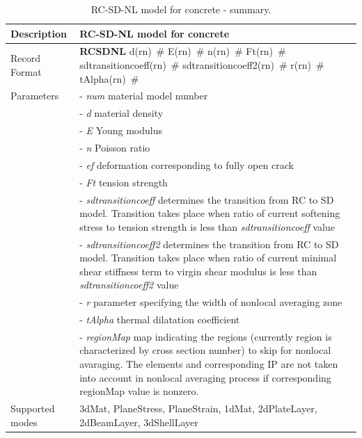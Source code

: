 \documentclass[epsf,a4paper]{article}
\newcommand{\descitem}[1]{{\noindent \bf #1}}
\newcommand{\elemparam}[2]{{{#1\tiny (#2)}~\#}}
\newcommand{\param}[1]{{\it #1}}
\begin{document}
\begin{table}[h]                                                                
\begin{tabular}{|l|p{9cm}|}                                                      
\hline                                                                          
Description & RC-SD-NL model for concrete\\
\hline                                                                          
Record Format & \descitem{RCSDNL} \elemparam{d}{rn} \elemparam{E}{rn}
\elemparam{n}{rn}  \elemparam{Ft}{rn}
\elemparam{sdtransitioncoeff}{rn} \elemparam{sdtransitioncoeff2}{rn}
\elemparam{r}{rn} \elemparam{tAlpha}{rn} \\
Parameters &- \param{num} material model number\\
&- \param{d} material density\\
&- \param{E} Young modulus\\
&- \param{n} Poisson ratio\\
&- \param{ef} deformation corresponding to fully open crack\\
&- \param{Ft} tension strength\\
&- \param{sdtransitioncoeff} determines the transition from RC to SD
model. Transition takes place when ratio of current softening
stress to tension strength is less than  \param{sdtransitioncoeff} value\\
&- \param{sdtransitioncoeff2} determines the transition from RC to SD
model. Transition takes place when ratio of current minimal shear
stiffness term to virgin shear modulus is less than  \param{sdtransitioncoeff2} value\\
&- \param{r} parameter specifying the width of nonlocal averaging zone\\
&- \param{tAlpha} thermal dilatation coefficient\\
&- \param{regionMap} map indicating the regions (currently region is
characterized by cross section number) to skip for nonlocal
avaraging. The elements and corresponding IP are not taken into
account in nonlocal averaging process if corresponding regionMap
value is nonzero.\\
Supported modes& 3dMat, PlaneStress, PlaneStrain, 1dMat,
2dPlateLayer, 2dBeamLayer, 3dShellLayer\\
\hline
\end{tabular}                                                                   
\caption{RC-SD-NL model for  concrete - summary.}                
\label{rcsdnl_table}                                                         
\end{table}                                                                     
\end{document}
